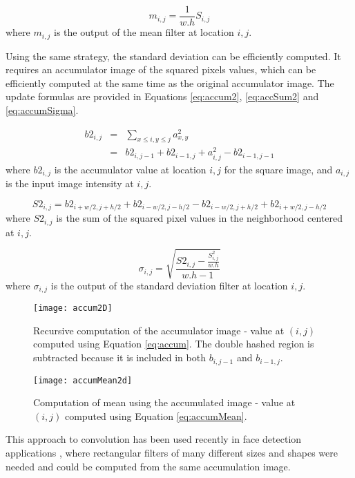\documentclass{InsightArticle}
\begin{document}
\begin{equation}
\label{eq:accumMean}
m_{i,j} = \frac{1}{w.h}S_{i,j}
\end{equation}
where $m_{i,j}$ is the output of the mean filter at location $i,j$.

Using the same strategy, the standard deviation can be efficiently
computed.  It requires an accumulator image of the squared pixels
values, which can be efficiently computed at the same time as the
original accumulator image. The update formulas are provided in
Equations \ref{eq:accum2}, \ref{eq:accSum2} and \ref{eq:accumSigma}.

\begin{eqnarray}
\label{eq:accum2}
b2_{i,j} & = & \sum_{x \leq i, y \leq j} a_{x,y}^2 \\ \nonumber
	& = & b2_{i,j-1} + b2_{i-1, j} + a_{i,j}^2 - b2_{i-1, j-1}
\end{eqnarray}
where $b2_{i,j}$ is the accumulator value at location $i,j$ for the square image, and $a_{i,j}$ is the input image intensity at $i,j$.

\begin{equation}
\label{eq:accSum2}
S2_{i,j} = b2_{i+w/2,j+h/2} + b2_{i-w/2,j-h/2} - b2_{i-w/2,j+h/2} + b2_{i+w/2,j-h/2}
\end{equation}
where $S2_{i,j}$ is the sum of the squared pixel values in the neighborhood centered at $i,j$.

\begin{equation}
\label{eq:accumSigma}
\sigma_{i,j} = \sqrt{\frac{S2_{i,j} - \frac{S_{i,j}^2}{w.h}}{w.h-1}}
\end{equation}
where $\sigma_{i,j}$ is the output of the standard deviation filter at location $i,j$.

\begin{figure}[htbp]
\centering
\texttt{[image: accum2D]}
\caption{Recursive computation of the accumulator image - value at $(i,j)$ computed using Equation \ref{eq:accum}. The double hashed region is subtracted because it is included in both $b_{i,j-1}$ and $b_{i-1, j}$.\label{fig:accum}}
\end{figure}

\begin{figure}[htbp]
\centering
\texttt{[image: accumMean2d]}
\caption{Computation of mean using the accumulated image - value at $(i,j)$ computed using Equation \ref{eq:accumMean}.\label{fig:accumMean}}
\end{figure}

This approach to convolution has been used recently in face detection
applications \cite{Viola2004}, where rectangular filters of many
different sizes and shapes were needed and could be computed from the same accumulation image.
\end{document}
